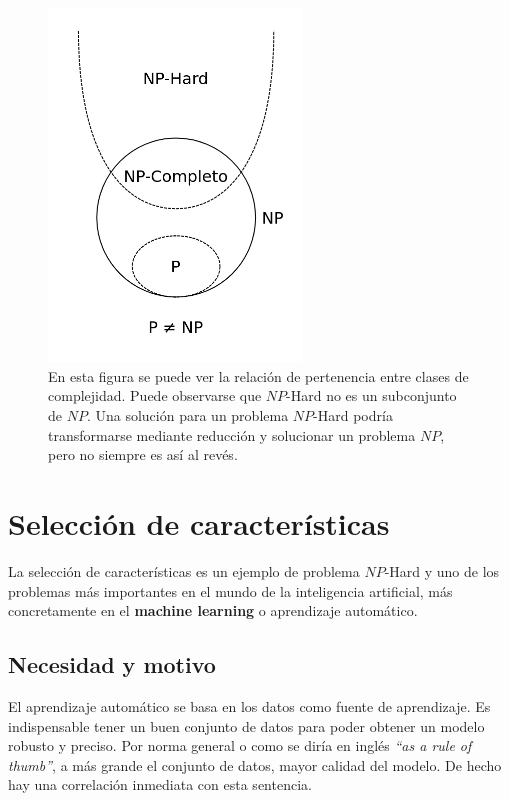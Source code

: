 \begin{figure}[H]
    \begin{center}
        \includegraphics[width=0.6\textwidth]{imagenes/np_subsets.png}
    \end{center}
    \caption[Relación entre clases de complejidad]{En esta figura se puede ver la relación de pertenencia entre clases de complejidad. Puede observarse que $NP$-Hard no es un subconjunto de $NP$. Una solución para un problema $NP$-Hard podría transformarse mediante reducción y solucionar un problema $NP$, pero no siempre es así al revés.}
\end{figure}

\section{Selección de características}
La selección de características es un ejemplo de problema $NP$-Hard y uno de los problemas más importantes en el mundo de la inteligencia artificial, más concretamente en el \textbf{machine learning} o aprendizaje automático.\\[6pt]

\subsection{Necesidad y motivo}
El aprendizaje automático se basa en los datos como fuente de aprendizaje. Es indispensable tener un buen conjunto de datos para poder obtener un modelo robusto y preciso. Por norma general o como se diría en inglés \textit{``as a rule of thumb''}, a más grande el conjunto de datos, mayor calidad del modelo. De hecho hay una correlación inmediata con esta sentencia.

